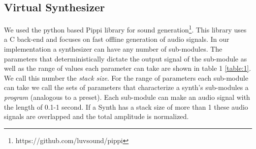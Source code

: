 \documentclass{nime-alternate} %
\begin{document}
\subsection{Virtual Synthesizer}
We used the python based Pippi library for sound generation\footnote{https://github.com/luvsound/pippi}. This library uses a C back-end and focuses on fast offline generation of audio signals. In our implementation a synthesizer can have any number of sub-modules. The parameters that deterministically dictate the output signal of the sub-module as well as the range of values each parameter can take are shown in table 1 \ref{table:1}. We call this number the \textit{stack size}. For the range of parameters each sub-module can take we call the sets of parameters that characterize a synth's sub-modules a \textit{program} (analogous to a preset).  Each sub-module can make an audio signal with the length of 0.1-1 second. If a Synth has a stack size of more than 1 these audio signals are overlapped and the total amplitude is normalized.\\
\begin{table}[h!]
\centering
{}
\caption{Synthesizer Sub-module Parameters. Despite the simplicity of the parameters and our efforts at constraining the ranges, the number of parameters that can be randomly chosen for each sub-module is in the order of $10^{15}$ }
\label{table:1}
\end{table}
\end{document}

